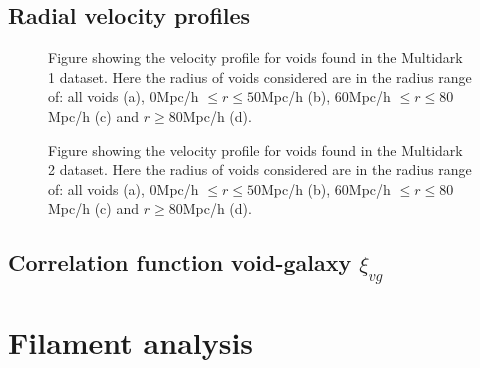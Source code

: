 \subsection{Radial velocity profiles}
\begin{figure}[htbp]\label{fig:histMD1}
    \hspace{1em}%
    \hspace{1em}%
    \caption{Figure showing the velocity profile for voids found in the Multidark 1 dataset. Here the radius of voids considered are in the radius range of: all voids (a), $0$Mpc/h $\leq r\leq 50$Mpc/h (b), $60$Mpc/h $\leq r\leq 80$Mpc/h (c) and $r\geq 80$Mpc/h (d).}
\end{figure}

\begin{figure}[htbp]\label{fig:histMD1}
    \hspace{1em}%
    \hspace{1em}%
    \caption{Figure showing the velocity profile for voids found in the Multidark 2 dataset. Here the radius of voids considered are in the radius range of: all voids (a), $0$Mpc/h $\leq r\leq 50$Mpc/h (b), $60$Mpc/h $\leq r\leq 80$Mpc/h (c) and $r\geq 80$Mpc/h (d).}
\end{figure}
\subsection{Correlation function void-galaxy $\xi_{vg}$}

\section{Filament analysis}

